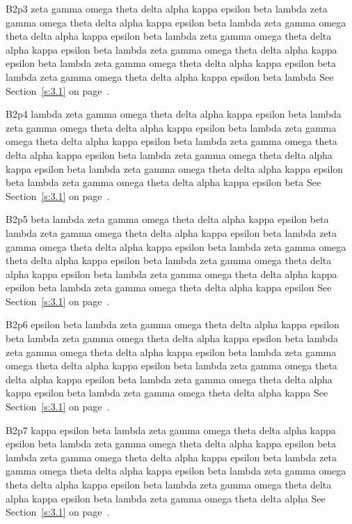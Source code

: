B2p3 zeta gamma omega theta delta alpha kappa epsilon beta lambda zeta gamma omega theta delta alpha kappa epsilon beta lambda zeta gamma omega theta delta alpha kappa epsilon beta lambda zeta gamma omega theta delta alpha kappa epsilon beta lambda zeta gamma omega theta delta alpha kappa epsilon beta lambda zeta gamma omega theta delta alpha kappa epsilon beta lambda zeta gamma omega theta delta alpha kappa epsilon beta lambda See Section~\ref{s:3.1} on page~\pageref{s:3.1}.

B2p4 lambda zeta gamma omega theta delta alpha kappa epsilon beta lambda zeta gamma omega theta delta alpha kappa epsilon beta lambda zeta gamma omega theta delta alpha kappa epsilon beta lambda zeta gamma omega theta delta alpha kappa epsilon beta lambda zeta gamma omega theta delta alpha kappa epsilon beta lambda zeta gamma omega theta delta alpha kappa epsilon beta lambda zeta gamma omega theta delta alpha kappa epsilon beta See Section~\ref{s:3.1} on page~\pageref{s:3.1}.

B2p5 beta lambda zeta gamma omega theta delta alpha kappa epsilon beta lambda zeta gamma omega theta delta alpha kappa epsilon beta lambda zeta gamma omega theta delta alpha kappa epsilon beta lambda zeta gamma omega theta delta alpha kappa epsilon beta lambda zeta gamma omega theta delta alpha kappa epsilon beta lambda zeta gamma omega theta delta alpha kappa epsilon beta lambda zeta gamma omega theta delta alpha kappa epsilon See Section~\ref{s:3.1} on page~\pageref{s:3.1}.

B2p6 epsilon beta lambda zeta gamma omega theta delta alpha kappa epsilon beta lambda zeta gamma omega theta delta alpha kappa epsilon beta lambda zeta gamma omega theta delta alpha kappa epsilon beta lambda zeta gamma omega theta delta alpha kappa epsilon beta lambda zeta gamma omega theta delta alpha kappa epsilon beta lambda zeta gamma omega theta delta alpha kappa epsilon beta lambda zeta gamma omega theta delta alpha kappa See Section~\ref{s:3.1} on page~\pageref{s:3.1}.

B2p7 kappa epsilon beta lambda zeta gamma omega theta delta alpha kappa epsilon beta lambda zeta gamma omega theta delta alpha kappa epsilon beta lambda zeta gamma omega theta delta alpha kappa epsilon beta lambda zeta gamma omega theta delta alpha kappa epsilon beta lambda zeta gamma omega theta delta alpha kappa epsilon beta lambda zeta gamma omega theta delta alpha kappa epsilon beta lambda zeta gamma omega theta delta alpha See Section~\ref{s:3.1} on page~\pageref{s:3.1}.

